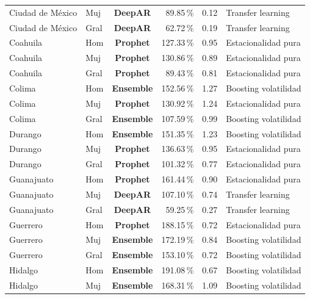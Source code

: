 \documentclass[12pt, letterpaper]{article}
\begin{document}
\begin{longtable}{l l >{\bfseries}c r r l}
Ciudad de México & Muj & \textcolor{cdeepar}{\textbf{DeepAR}} & 89.85\,\% & 0.12 & Transfer learning \\
Ciudad de México & Gral & \textcolor{cdeepar}{\textbf{DeepAR}} & 62.72\,\% & 0.19 & Transfer learning \\
Coahuila & Hom & \textcolor{cprophet}{\textbf{Prophet}} & 127.33\,\% & 0.95 & Estacionalidad pura \\
Coahuila & Muj & \textcolor{cprophet}{\textbf{Prophet}} & 130.86\,\% & 0.89 & Estacionalidad pura \\
Coahuila & Gral & \textcolor{cprophet}{\textbf{Prophet}} & 89.43\,\% & 0.81 & Estacionalidad pura \\
Colima & Hom & \textcolor{censemble}{\textbf{Ensemble}} & 152.56\,\% & 1.27 & Boosting volatilidad \\
Colima & Muj & \textcolor{cprophet}{\textbf{Prophet}} & 130.92\,\% & 1.24 & Estacionalidad pura \\
Colima & Gral & \textcolor{censemble}{\textbf{Ensemble}} & 107.59\,\% & 0.99 & Boosting volatilidad \\
Durango & Hom & \textcolor{censemble}{\textbf{Ensemble}} & 151.35\,\% & 1.23 & Boosting volatilidad \\
Durango & Muj & \textcolor{cprophet}{\textbf{Prophet}} & 136.63\,\% & 0.95 & Estacionalidad pura \\
Durango & Gral & \textcolor{cprophet}{\textbf{Prophet}} & 101.32\,\% & 0.77 & Estacionalidad pura \\
Guanajuato & Hom & \textcolor{cprophet}{\textbf{Prophet}} & 161.44\,\% & 0.90 & Estacionalidad pura \\
Guanajuato & Muj & \textcolor{cdeepar}{\textbf{DeepAR}} & 107.10\,\% & 0.74 & Transfer learning \\
Guanajuato & Gral & \textcolor{cdeepar}{\textbf{DeepAR}} & 59.25\,\% & 0.27 & Transfer learning \\
Guerrero & Hom & \textcolor{cprophet}{\textbf{Prophet}} & 188.15\,\% & 0.72 & Estacionalidad pura \\
Guerrero & Muj & \textcolor{censemble}{\textbf{Ensemble}} & 172.19\,\% & 0.84 & Boosting volatilidad \\
Guerrero & Gral & \textcolor{censemble}{\textbf{Ensemble}} & 153.10\,\% & 0.72 & Boosting volatilidad \\
Hidalgo & Hom & \textcolor{censemble}{\textbf{Ensemble}} & 191.08\,\% & 0.67 & Boosting volatilidad \\
Hidalgo & Muj & \textcolor{censemble}{\textbf{Ensemble}} & 168.31\,\% & 1.09 & Boosting volatilidad \\

\end{longtable}
\end{document}
